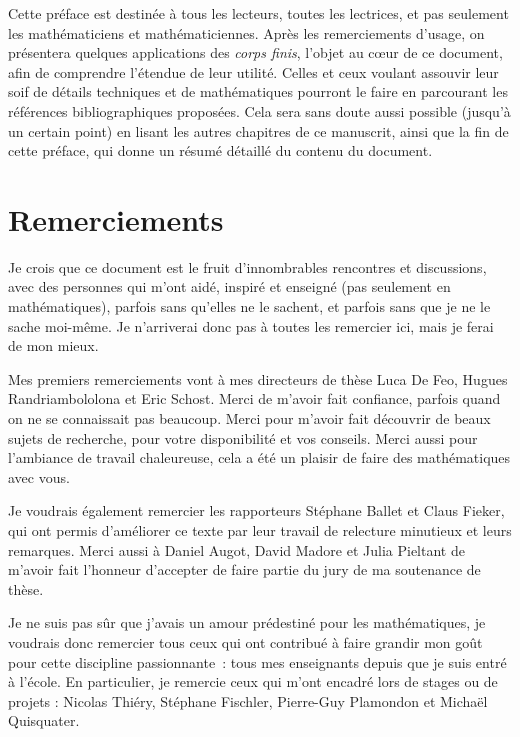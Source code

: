 Cette préface est destinée à tous les lecteurs, toutes les lectrices, et pas
seulement les mathématiciens et mathématiciennes. Après les remerciements
d'usage, on présentera quelques applications des \emph{corps finis}, l'objet au
cœur de ce document, afin de comprendre l'étendue de leur utilité. Celles et ceux
voulant assouvir leur soif de détails techniques et de mathématiques
pourront le faire en parcourant les références bibliographiques proposées. Cela
sera sans doute aussi possible (jusqu'à un certain point) en lisant les autres
chapitres de ce manuscrit, ainsi que la fin de cette préface, qui donne un
résumé détaillé du contenu du document.

\minitoc
%
\clearpage

\section*{Remerciements}

Je crois que ce document est le fruit d'innombrables rencontres et discussions,
avec des personnes qui m'ont aidé, inspiré et enseigné (pas seulement en
mathématiques), parfois sans qu'elles ne le
sachent, et parfois sans que je ne le sache moi-même. Je n'arriverai donc pas à
toutes les remercier ici, mais je ferai de mon mieux.

Mes premiers remerciements vont à mes directeurs de thèse Luca De Feo, Hugues
Randriambololona et Eric Schost. Merci de m'avoir
fait confiance, parfois quand on ne se connaissait pas beaucoup. Merci pour
m'avoir fait découvrir de beaux sujets de recherche, pour votre disponibilité et
vos conseils. Merci aussi pour l'ambiance de travail chaleureuse, cela a été un
plaisir de faire des mathématiques avec vous.

Je voudrais également remercier les rapporteurs Stéphane Ballet et Claus Fieker,
qui ont permis d'améliorer ce texte par leur travail de relecture minutieux et
leurs remarques. Merci aussi à Daniel Augot, David Madore et Julia Pieltant de
m'avoir fait l'honneur d'accepter de faire partie du jury de ma soutenance de
thèse.

Je ne suis pas sûr que j'avais un amour prédestiné pour les mathématiques, je
voudrais donc remercier tous ceux qui ont contribué à faire grandir mon goût
pour cette discipline passionnante~: tous mes enseignants depuis que je suis
entré à l'école. En particulier, je remercie ceux qui m'ont encadré lors de
stages ou de projets : Nicolas Thiéry, Stéphane Fischler, Pierre-Guy Plamondon
et Michaël Quisquater.

